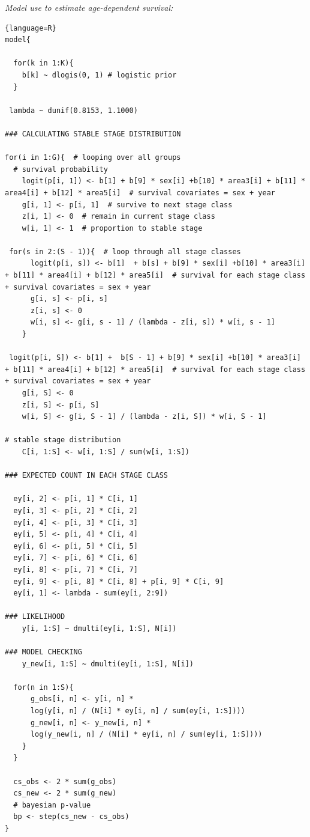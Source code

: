 \documentclass[PCJ,Unicode,screen]{cedram}
\begin{document}
\emph{Model use to estimate age-dependent survival:} \label{app:brood}
\begin{lstlisting}{language=R}
model{
 
  for(k in 1:K){
    b[k] ~ dlogis(0, 1) # logistic prior
  }
 
 lambda ~ dunif(0.8153, 1.1000) 
  
### CALCULATING STABLE STAGE DISTRIBUTION

for(i in 1:G){  # looping over all groups
  # survival probability
    logit(p[i, 1]) <- b[1] + b[9] * sex[i] +b[10] * area3[i] + b[11] * area4[i] + b[12] * area5[i]  # survival covariates = sex + year
    g[i, 1] <- p[i, 1]  # survive to next stage class
    z[i, 1] <- 0  # remain in current stage class
    w[i, 1] <- 1  # proportion to stable stage
    
 for(s in 2:(S - 1)){  # loop through all stage classes
      logit(p[i, s]) <- b[1]  + b[s] + b[9] * sex[i] +b[10] * area3[i] + b[11] * area4[i] + b[12] * area5[i]  # survival for each stage class + survival covariates = sex + year
      g[i, s] <- p[i, s]
      z[i, s] <- 0
      w[i, s] <- g[i, s - 1] / (lambda - z[i, s]) * w[i, s - 1]
    }
    
 logit(p[i, S]) <- b[1] +  b[S - 1] + b[9] * sex[i] +b[10] * area3[i] + b[11] * area4[i] + b[12] * area5[i]  # survival for each stage class + survival covariates = sex + year
    g[i, S] <- 0
    z[i, S] <- p[i, S]
    w[i, S] <- g[i, S - 1] / (lambda - z[i, S]) * w[i, S - 1]
    
# stable stage distribution
    C[i, 1:S] <- w[i, 1:S] / sum(w[i, 1:S])
    
### EXPECTED COUNT IN EACH STAGE CLASS

  ey[i, 2] <- p[i, 1] * C[i, 1]
  ey[i, 3] <- p[i, 2] * C[i, 2]
  ey[i, 4] <- p[i, 3] * C[i, 3]
  ey[i, 5] <- p[i, 4] * C[i, 4]
  ey[i, 6] <- p[i, 5] * C[i, 5]
  ey[i, 7] <- p[i, 6] * C[i, 6]
  ey[i, 8] <- p[i, 7] * C[i, 7]
  ey[i, 9] <- p[i, 8] * C[i, 8] + p[i, 9] * C[i, 9]
  ey[i, 1] <- lambda - sum(ey[i, 2:9])
    
### LIKELIHOOD
    y[i, 1:S] ~ dmulti(ey[i, 1:S], N[i])

### MODEL CHECKING
    y_new[i, 1:S] ~ dmulti(ey[i, 1:S], N[i])
    
  for(n in 1:S){
      g_obs[i, n] <- y[i, n] *
      log(y[i, n] / (N[i] * ey[i, n] / sum(ey[i, 1:S])))
      g_new[i, n] <- y_new[i, n] *
      log(y_new[i, n] / (N[i] * ey[i, n] / sum(ey[i, 1:S])))
    }
  }
  
  cs_obs <- 2 * sum(g_obs)
  cs_new <- 2 * sum(g_new)
  # bayesian p-value
  bp <- step(cs_new - cs_obs)  
}
\end{lstlisting}


\printbibliography
\end{document}
